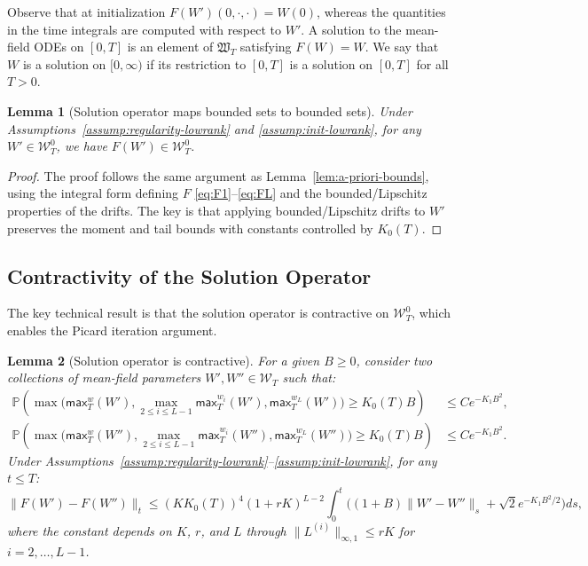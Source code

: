 \documentclass[11pt]{article}
\newcommand{\Pp}{\mathbb{P}}
\newcommand{\1}{\mathbbm{1}}
\newtheorem{lemma}{Lemma}
\begin{document}
Observe that at initialization $F(W')(0,\cdot,\cdot)=W(0)$, whereas the quantities in the time integrals are computed with respect to $W'$. A solution to the mean-field ODEs on $[0,T]$ is an element of $\mathfrak{W}_T$ satisfying $F(W)=W$. We say that $W$ is a solution on $[0,\infty)$ if its restriction to $[0,T]$ is a solution on $[0,T]$ for all $T>0$.

\begin{lemma}[Solution operator maps bounded sets to bounded sets]
\label{lem:invariance-F}
Under Assumptions~\ref{assump:regularity-lowrank} and \ref{assump:init-lowrank}, for any $W'\in\mathcal{W}_T^0$, we have $F(W')\in\mathcal{W}_T^0$.
\end{lemma}

\begin{proof}
The proof follows the same argument as Lemma~\ref{lem:a-priori-bounds}, using the integral form defining $F$ \eqref{eq:F1}--\eqref{eq:FL} and the bounded/Lipschitz properties of the drifts. The key is that applying bounded/Lipschitz drifts to $W'$ preserves the moment and tail bounds with constants controlled by $K_0(T)$.
\end{proof}

\subsection{Contractivity of the Solution Operator}

The key technical result is that the solution operator is contractive on $\mathcal{W}_T^0$, which enables the Picard iteration argument.

\begin{lemma}[Solution operator is contractive]
\label{lem:contractivity-F}
For a given $B\ge 0$, consider two collections of mean-field parameters $W',W''\in\mathcal{W}_T$ such that:
\begin{align}
\Pp\!\left(\max\big(\mathsf{max}_T^w(W'), \max_{2\le i\le L-1}\mathsf{max}_T^{w_i}(W'), \mathsf{max}_T^{w_L}(W')\big)\ge K_0(T)B\right) &\le C e^{-K_1 B^2},\label{eq:tail-W'}\\
\Pp\!\left(\max\big(\mathsf{max}_T^w(W''), \max_{2\le i\le L-1}\mathsf{max}_T^{w_i}(W''), \mathsf{max}_T^{w_L}(W'')\big)\ge K_0(T)B\right) &\le C e^{-K_1 B^2}.\label{eq:tail-W''}
\end{align}
Under Assumptions~\ref{assump:regularity-lowrank}--\ref{assump:init-lowrank}, for any $t\le T$:
\[
\|F(W')-F(W'')\|_t \le (KK_0(T))^4(1+rK)^{L-2} \int_0^t \Big((1+B)\|W'-W''\|_s + \sqrt{2}e^{-K_1 B^2/2}\Big)ds,
\]
where the constant depends on $K$, $r$, and $L$ through $\|L^{(i)}\|_{\infty,1}\le rK$ for $i=2,\ldots,L-1$.
\end{lemma}
\end{document}
